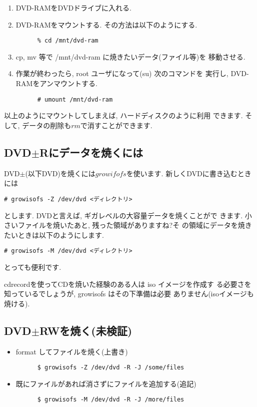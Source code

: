 \documentclass{jarticle}
\begin{document}
\begin{enumerate}
\item DVD-RAMをDVDドライブに入れる.
\item DVD-RAMをマウントする. その方法は以下のようにする.

      \begin{verbatim}
      % cd /mnt/dvd-ram
      \end{verbatim}

\item cp, mv 等で /mnt/dvd-ram に焼きたいデータ(ファイル等)を
      移動させる.
\item 作業が終わったら, root ユーザになって(su) 次のコマンドを
      実行し, DVD-RAMをアンマウントする.

      \begin{verbatim}
      # umount /mnt/dvd-ram
      \end{verbatim}

\end{enumerate}
以上のようにマウントしてしまえば, ハードディスクのように利用
できます. そして, データの削除も$rm$で消すことができます.

\subsection{DVD$\pm$Rにデータを焼くには}

DVD$\pm$(以下DVD)を焼くには$growifofs$を使います.
新しくDVDに書き込むときには

\begin{verbatim}
# growisofs -Z /dev/dvd <ディレクトリ>
\end{verbatim}
とします. DVDと言えば, ギガレベルの大容量データを焼くことがで
きます. 小さいファイルを焼いたあと, 残った領域がありますね?そ
の領域にデータを焼きたいときは以下のようにします.

\begin{verbatim}
# growisofs -M /dev/dvd <ディレクトリ>
\end{verbatim}
とっても便利です.

cdrecordを使ってCDを焼いた経験のある人は iso イメージを作成す
る必要さを知っているでしょうが, growisofs はその下準備は必要
ありません(isoイメージも焼ける).

\subsection{DVD$\pm$RWを焼く(未検証)}

\begin{itemize}
\item format してファイルを焼く(上書き)

      \begin{verbatim}
      $ growisofs -Z /dev/dvd -R -J /some/files
      \end{verbatim}

\item 既にファイルがあれば消さずにファイルを追加する(追記)

      \begin{verbatim}
      $ growisofs -M /dev/dvd -R -J /more/files
      \end{verbatim}

\end{itemize}
\end{document}
